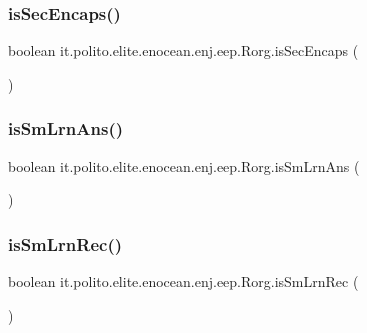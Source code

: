 \subsubsection{\texorpdfstring{is\+Sec\+Encaps()}{isSecEncaps()}}
{\footnotesize\ttfamily boolean it.\+polito.\+elite.\+enocean.\+enj.\+eep.\+Rorg.\+is\+Sec\+Encaps (\begin{DoxyParamCaption}{ }\end{DoxyParamCaption})}

\hypertarget{classit_1_1polito_1_1elite_1_1enocean_1_1enj_1_1eep_1_1_rorg_ad1e4dec5eafea746a276b700cac72964}{}\label{classit_1_1polito_1_1elite_1_1enocean_1_1enj_1_1eep_1_1_rorg_ad1e4dec5eafea746a276b700cac72964} 
\subsubsection{\texorpdfstring{is\+Sm\+Lrn\+Ans()}{isSmLrnAns()}}
{\footnotesize\ttfamily boolean it.\+polito.\+elite.\+enocean.\+enj.\+eep.\+Rorg.\+is\+Sm\+Lrn\+Ans (\begin{DoxyParamCaption}{ }\end{DoxyParamCaption})}

\hypertarget{classit_1_1polito_1_1elite_1_1enocean_1_1enj_1_1eep_1_1_rorg_ac28fde2bd8333bc1597e6160bd31fc33}{}\label{classit_1_1polito_1_1elite_1_1enocean_1_1enj_1_1eep_1_1_rorg_ac28fde2bd8333bc1597e6160bd31fc33} 
\subsubsection{\texorpdfstring{is\+Sm\+Lrn\+Rec()}{isSmLrnRec()}}
{\footnotesize\ttfamily boolean it.\+polito.\+elite.\+enocean.\+enj.\+eep.\+Rorg.\+is\+Sm\+Lrn\+Rec (\begin{DoxyParamCaption}{ }\end{DoxyParamCaption})}

\hypertarget{classit_1_1polito_1_1elite_1_1enocean_1_1enj_1_1eep_1_1_rorg_a815882ad0a41bfc3ad81bd3c3d605ff9}{}\label{classit_1_1polito_1_1elite_1_1enocean_1_1enj_1_1eep_1_1_rorg_a815882ad0a41bfc3ad81bd3c3d605ff9} 
